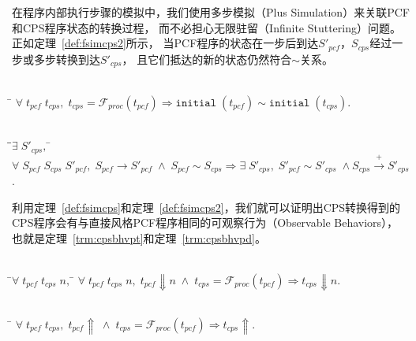 在程序内部执行步骤的模拟中，我们使用多步模拟（Plus Simulation）来关联PCF和CPS程序状态的转换过程，
而不必担心无限驻留（Infinite Stuttering）问题。正如定理~\ref{def:fsimcps2}所示，
当PCF程序的状态在一步后到达$S'_{pcf}$，$S_{cps}$经过一步或多步转换到达$S'_{cps}$，
且它们抵达的新的状态仍然符合$\sim$关系。

\begin{theorem}[CPS转换中初始状态的模拟]\label{def:fsimcps}
    \begin{tabbing}
      \\
    \quad\=\kill 
    \>$\forall\; t_{pcf} \; t_{cps},\;
       t_{cps}=\mathcal{F}_{proc}(t_{pcf})\Longrightarrow \mathtt{initial}\; (t_{pcf})
       \sim \mathtt{initial}\; (t_{cps}).$
    \end{tabbing}
\end{theorem}

\begin{theorem}[CPS转换中程序内部执行步骤的模拟]\label{def:fsimcps2}
    \begin{tabbing}
      \\
    \quad\=\qquad\=$\exists\; S'_{cps},\; $\=\kill
    \>$\forall \; S_{pcf}\; S_{cps}\; S'_{pcf},\; S_{pcf}\rightarrow S'_{pcf}\; \wedge \; S_{pcf}\sim S_{cps} \Longrightarrow \exists\; S'_{cps},\; S'_{pcf}\sim S'_{cps}\; \wedge
        S_{cps}\xrightarrow{+} S'_{cps}$.
    \end{tabbing}
\end{theorem}

利用定理~\ref{def:fsimcps}和定理~\ref{def:fsimcps2}，我们就可以证明出CPS转换得到的
CPS程序会有与直接风格PCF程序相同的可观察行为（Observable Behaviors），
也就是定理~\ref{trm:cpsbhvpt}和定理~\ref{trm:cpsbhvpd}。

\begin{theorem}[CPS程序对PCF程序终止行为的保存]\label{trm:cpsbhvpt} 
    \begin{tabbing}
     \\
    \quad\=$\forall \; t_{pcf}\; t_{cps}\; n,\; $\=\kill
    \>$\forall \; t_{pcf}\; t_{cps}\; n,\; t_{pcf}\Downarrow n\; \wedge \; t_{cps}=\mathcal{F}_{proc}(t_{pcf}) \Longrightarrow t_{cps}\Downarrow n.$
    \end{tabbing}
  \end{theorem}
  
  \begin{theorem}[CPS程序对PCF程序发散行为的保存]\label{trm:cpsbhvpd}
    \begin{tabbing}
      \\
    \quad\=\kill
    \>$\forall \; t_{pcf}\; t_{cps},\; t_{pcf}\Uparrow\; \wedge \; t_{cps}=\mathcal{F}_{proc}(t_{pcf})\Longrightarrow t_{cps}\Uparrow.$
    \end{tabbing}
  \end{theorem}


